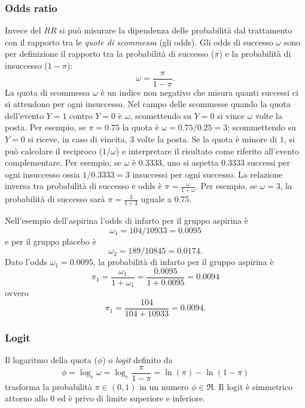 \subsubsection{Odds ratio}

Invece del $RR$ si può misurare la dipendenza delle probabilità dal trattamento con il rapporto tra le \emph{quote di scommessa} (gli odds).
Gli odds di successo $\omega$ sono per definizione il rapporto tra la probabilità di successo ($\pi$) e la probabilità di insuccesso ($1 - \pi$):
\[
  \omega = \frac{\pi}{1 - \pi}.
\]
La quota di scommessa $\omega$ è un indice non negativo
che misura quanti successi ci si attendono per ogni insuccesso.
Nel campo delle scommesse  quando la quota dell'evento $Y =
    1$ contro $Y = 0$ è $\omega$, scomettendo su $Y = 0$
    si vince $\omega$ volte la posta.
Per esempio, se $\pi = 0.75$ la quota è $\omega = 0.75/0.25 = 3$; scommettendo su $Y = 0$ si riceve, in caso di vincita, 3 volte la posta.
Se la quota è minore di $1$, si può calcolare il reciproco ($1/\omega$) e interpretare il risultato come riferito all'evento complementare.
Per esempio, se $\omega$ è $0.3333$, uno si aspetta $0.3333$ successi per ogni insuccesso ossia
$1/0.3333=3$ insuccessi per ogni successo.
La relazione inversa tra  probabilità di successo e odds
è
$
\pi =\frac{\omega}{1 + \omega}.
$
Per esempio, se $\omega =3$, la probabilità di successo sarà
$
\pi = \frac{3}{1 + 3} 
$
uguale a 0.75.

\begin{exmp}
Nell'esempio dell'aspirina l'odds di infarto per il gruppo aspirina è
\[
\omega_1 = 104/10933 = 0.0095
\]
e per il gruppo placebo è 
\[
\omega_2 = 189/10845 = 0.0174.
\]
Dato l'odds $\omega_1 = 0.0095$, la probabilità di infarto per il gruppo aspirina è
\[
\pi_1 =\frac{\omega_1}{1 + \omega_1} = \frac{0.0095}{1 + 0.0095}= 0.0094
\]
 ovvero
\[
\pi_1 = \frac{104}{104+10933}= 0.0094.
\]
\end{exmp}


\subsubsection{Logit}

Il logaritmo della quota ($\phi$) o \emph{logit} definito da
    \[
    \phi = \log_e \omega = \log_e \frac{\pi}{1 - \pi} = \ln (\pi) - \ln (1-\pi)
    \]
trasforma la probabilità $\pi \in (0, 1)$ in un numero $\phi \in \Re$.
Il logit è simmetrico attorno allo 0 ed è privo di limite superiore e inferiore.

